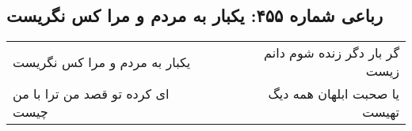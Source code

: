 \begin{center}
\section*{رباعی شماره ۴۵۵: یکبار به مردم و مرا کس نگریست}
\label{sec:0455}
\begin{longtable}{l p{0.5cm} r}
یکبار به مردم و مرا کس نگریست
&&
گر بار دگر زنده شوم دانم زیست
\\
ای کرده تو قصد من ترا با من چیست
&&
یا صحبت ابلهان همه دیگ تهیست
\\
\end{longtable}
\end{center}
